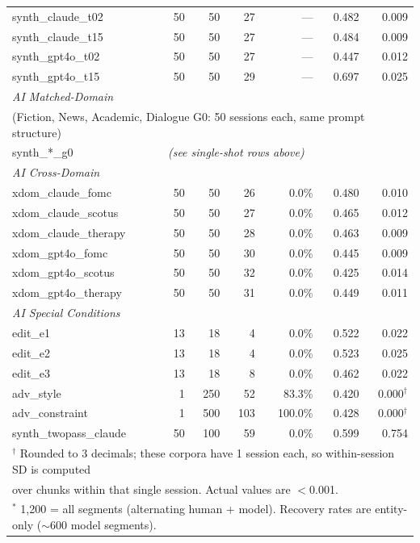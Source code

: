 \documentclass[11pt]{article}
\begin{document}
\begin{table}[h!]
\begin{tabular}{lrrrrrr}
synth\_claude\_t02 & 50 & 50 & 27 & --- & 0.482 & 0.009 \\
synth\_claude\_t15 & 50 & 50 & 27 & --- & 0.484 & 0.009 \\
synth\_gpt4o\_t02 & 50 & 50 & 27 & --- & 0.447 & 0.012 \\
synth\_gpt4o\_t15 & 50 & 50 & 29 & --- & 0.697 & 0.025 \\
\midrule
\multicolumn{7}{l}{\textit{AI Matched-Domain}} \\
\multicolumn{7}{l}{(Fiction, News, Academic, Dialogue G0: 50 sessions each, same prompt structure)} \\
synth\_*\_g0 & \multicolumn{6}{l}{\textit{(see single-shot rows above)}} \\
\midrule
\multicolumn{7}{l}{\textit{AI Cross-Domain}} \\
xdom\_claude\_fomc & 50 & 50 & 26 & 0.0\% & 0.480 & 0.010 \\
xdom\_claude\_scotus & 50 & 50 & 27 & 0.0\% & 0.465 & 0.012 \\
xdom\_claude\_therapy & 50 & 50 & 28 & 0.0\% & 0.463 & 0.009 \\
xdom\_gpt4o\_fomc & 50 & 50 & 30 & 0.0\% & 0.445 & 0.009 \\
xdom\_gpt4o\_scotus & 50 & 50 & 32 & 0.0\% & 0.425 & 0.014 \\
xdom\_gpt4o\_therapy & 50 & 50 & 31 & 0.0\% & 0.449 & 0.011 \\
\midrule
\multicolumn{7}{l}{\textit{AI Special Conditions}} \\
edit\_e1 & 13 & 18 & 4 & 0.0\% & 0.522 & 0.022 \\
edit\_e2 & 13 & 18 & 4 & 0.0\% & 0.523 & 0.025 \\
edit\_e3 & 13 & 18 & 8 & 0.0\% & 0.462 & 0.022 \\
adv\_style & 1 & 250 & 52 & 83.3\% & 0.420 & 0.000$^\dagger$ \\
adv\_constraint & 1 & 500 & 103 & 100.0\% & 0.428 & 0.000$^\dagger$ \\
synth\_twopass\_claude & 50 & 100 & 59 & 0.0\% & 0.599 & 0.754 \\
\bottomrule
\multicolumn{7}{l}{\footnotesize $^\dagger$ Rounded to 3 decimals; these corpora have 1 session each, so within-session SD is computed} \\
\multicolumn{7}{l}{\footnotesize \phantom{$^\dagger$} over chunks within that single session. Actual values are $<$0.001.} \\
\multicolumn{7}{l}{\footnotesize $^*$ 1,200 = all segments (alternating human + model). Recovery rates are entity-only ($\sim$600 model segments).} \\
\end{tabular}
\end{table}
\end{document}
